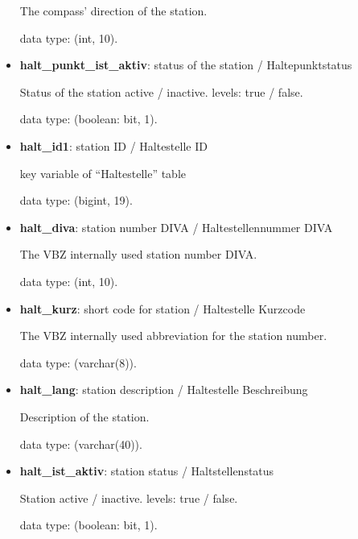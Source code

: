 \documentclass[11pt]{article}
\begin{document}
\begin{itemize}
	The compass' direction of the station.
	
	data type: (int, 10).
	
	\item \textbf{halt\_punkt\_ist\_aktiv}: status of the station / Haltepunktstatus
	
	Status of the station active / inactive. levels: true / false.
	
	data type: (boolean: bit, 1).
	
	\item \textbf{halt\_id1}: station ID / Haltestelle ID
	
	key variable of ``Haltestelle'' table
		
	data type: (bigint, 19).

	\item \textbf{halt\_diva}: station number DIVA / Haltestellennummer DIVA
	
	The VBZ internally used station number DIVA.
	
	data type: (int, 10).
	
	\item \textbf{halt\_kurz}: short code for station / Haltestelle Kurzcode
	
	The VBZ internally used abbreviation for the station number.
	
	data type: (varchar(8)).
	
	\item \textbf{halt\_lang}: station description / Haltestelle Beschreibung
	
	Description of the station.
	
	data type: (varchar(40)).
	
	\item \textbf{halt\_ist\_aktiv}: station status / Haltstellenstatus
	
	Station active / inactive. levels: true / false.
	
	data type: (boolean: bit, 1).
	
	
\end{itemize}
\end{document}

